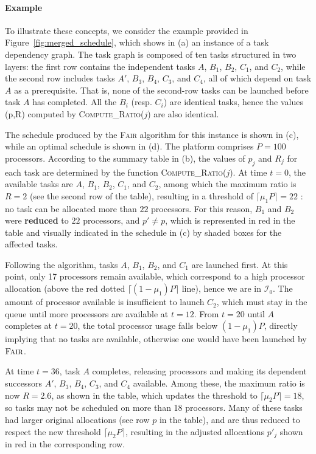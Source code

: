 \documentclass{article}
\newcommand\fair{\textsc{Fair}\xspace}
\newcommand\ratio{R\xspace}
\begin{document}
\paragraph{Example } To illustrate these concepts, we consider the example provided in Figure~\ref{fig:merged_schedule}, which shows in (a) an instance of a task dependency graph. The task graph is composed of ten tasks structured in two layers: the first row contains the independent tasks $A$, $B_1$, $B_2$, $C_1$, and $C_2$, while the second row includes tasks $A'$, $B_3$, $B_4$, $C_3$, and $C_4$, all of which depend on task $A$ as a prerequisite. That is, none of the second-row tasks can be launched before task $A$ has completed. All the $B_i$ (resp. $C_i$) are identical tasks, hence the values (p,R) computed by \textsc{Compute\_Ratio}($j$) are also identical.

The schedule produced by the \textsc{Fair} algorithm for this instance is shown in (c), while an optimal schedule is shown in (d). The platform comprises $P = 100$ processors. According to the summary table in (b), the values of $p_j$ and $\ratio_j$ for each task are determined by the function \textsc{Compute\_Ratio}($j$). At time $t=0$, the available tasks are $A$, $B_1$, $B_2$, $C_1$, and $C_2$, among which the maximum ratio is $\ratio = 2$ (see the second row of the table), resulting in a threshold of $\lceil \mu_1 P \rceil = 22$ : no task can be allocated more than $22$ processors. For this reason, $B_1$ and $B_2$ were \textbf{reduced} to $22$ processors, and $p' \neq p$, which is represented in red in the table and visually indicated in the schedule in (c) by shaded boxes for the affected tasks.

Following the algorithm, tasks $A$, $B_1$, $B_2$, and $C_1$ are launched first. At this point, only 17 processors remain available, which correspond to a high processor allocation (above the red dotted $\lceil (1-\mu_1) P \rceil$ line), hence we are in $\mathcal{I}_0$. The amount of processor available is insufficient to launch $C_2$, which must stay in the queue until more processors are available at $t=12$. From $t=20$ until $A$ completes at $t=20$, the total processor usage falls below $(1-\mu_1) P$, directly implying that no tasks are available, otherwise one would have been launched by $\fair$.

At time $t=36$, task $A$ completes, releasing processors and making its dependent successors $A'$, $B_3$, $B_4$, $C_3$, and $C_4$ available. Among these, the maximum ratio is now $\ratio = 2.6$, as shown in the table, which updates the threshold to $\lceil \mu_2 P \rceil = 18$, so tasks may not be scheduled on more than 18 processors. Many of these tasks had larger original allocations (see row $p$ in the table), and are thus reduced to respect the new threshold $\lceil \mu_2 P \rceil$, resulting in the adjusted allocations $p'_j$ shown in red in the corresponding row.  
\end{document}
